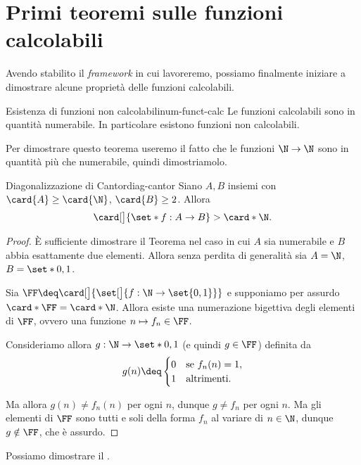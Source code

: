 \section{Primi teoremi sulle funzioni calcolabili}

Avendo stabilito il \emph{framework} in cui lavoreremo, possiamo finalmente iniziare a dimostrare alcune proprietà delle funzioni calcolabili.

\begin{theorem}
    {Esistenza di funzioni non calcolabili}{num-funct-calc}
    Le funzioni calcolabili sono in quantità numerabile. In particolare esistono funzioni non calcolabili.
\end{theorem}

Per dimostrare questo teorema useremo il fatto che le funzioni $\N \to \N$ sono in quantità più che numerabile, quindi dimostriamolo.

\begin{theorem}
    {Diagonalizzazione di Cantor}{diag-cantor}
    Siano $A, B$ insiemi con $\card{A} \geq \card{\N}$, $\card{B} \geq 2$. Allora \[
        \card[\big]{\set*{f : A \to B}} > \card*{\N}.
    \]  
\end{theorem}
\begin{proof}
    È sufficiente dimostrare il Teorema nel caso in cui $A$ sia numerabile e $B$ abbia esattamente due elementi. Allora senza perdita di generalità sia $A = \N$, $B = \set*{0, 1}$.
    
    Sia $\FF \deq \card[\big]{\set[\big]{f : \N \to \set{0, 1}}}$ e supponiamo per assurdo $\card*{\FF} = \card*{\N}$. Allora esiste una numerazione bigettiva degli elementi di $\FF$, ovvero una funzione $n \mapsto f_n \in \FF$.
    
    Consideriamo allora $g : \N \to \set*{0, 1}$ (e quindi $g \in \FF$) definita da \[
        g(n) \deq \begin{cases}
            0 &\text{se } f_n(n) = 1,\\
            1 &\text{altrimenti}.
        \end{cases}
    \] 

    Ma allora $g(n) \neq f_n(n)$ per ogni $n$, dunque $g \neq f_n$ per ogni $n$. Ma gli elementi di $\FF$ sono tutti e soli della forma $f_n$ al variare di $n \in \N$, dunque $g \notin \FF$, che è assurdo.   
\end{proof}

Possiamo dimostrare il .


